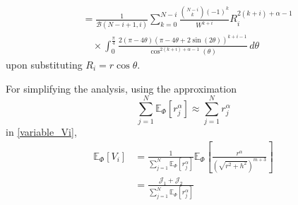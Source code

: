 \documentclass{beamer}
\providecommand{\sbrak}[1]{\ensuremath{{}\left[#1\right]}}
\providecommand{\brak}[1]{\ensuremath{\left(#1\right)}}
\providecommand{\lbrak}[1]{\ensuremath{\left(#1\right.}}
\providecommand{\rbrak}[1]{\ensuremath{\left.#1\right)}}
\theoremstyle{remark}
\begin{document}
\begin{frame}
\begin{align}
   & = \frac{1}{\mathcal{B}\brak{N-i+1,i}}\sum_{k=0}^{N-i}\frac{\binom{N-i}{k}(-1)^k}{W^{k+i}}
   R_i^{2\brak{k+i}+\alpha-1} \nonumber \\
   &\quad \times \int_{0}^{\frac{\pi}{4}} \frac{2\brak{\pi-4\theta}\brak{\pi-4\theta+2\sin\brak{2\theta}}^{k+i-1} }{\cos^{2\brak{k+i}+\alpha-1}\brak{\theta}}\,d \theta
   \end{align}
   upon substituting $R_i = r \cos \theta$.
\label{app_Pe}
 \end{frame}
 \begin{frame}
 For simplifying the analysis, using the approximation
\begin{equation}
\sum_{j=1}^N\mathbb{E}_{\Phi}\sbrak{r_j^{\alpha}} \approx \sum_{j=1}^Nr_j^{\alpha}
\end{equation}
in \eqref{variable_Vi},
   \begin{align}
   \mathbb{E}_{\Phi}\sbrak{V_i}&=\frac{1}{\sum_{j=1}^N\mathbb{E}_{\Phi}\sbrak{r_j^{\alpha}} }\mathbb{E}_{\Phi}\sbrak{\frac{r^{\alpha}}{\brak{\sqrt{r^2+h^2}}^{m+3}}} \\
    & =  \frac{ \mathcal{J}_1 + \mathcal{J}_2}{\sum_{j=1}^N\mathbb{E}_{\Phi}\sbrak{r_j^{\alpha}} }
   \end{align}
   \end{frame}
\end{document}
